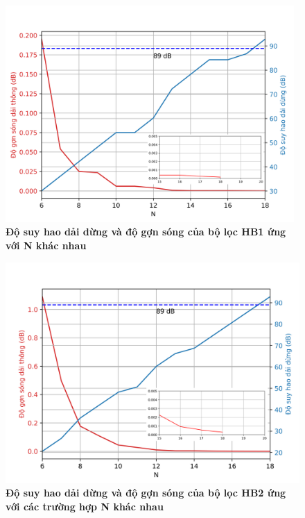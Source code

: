 \begin{figure}[H]
    \centering
    \includegraphics[width=11cm]{Images/Chuong4/plot/hb1.png}
    \caption[Độ suy hao dải dừng và độ gợn sóng của bộ lọc HB1 ứng với N khác nhau]{\bfseries \fontsize{12pt}{0pt}\selectfont Độ suy hao dải dừng và độ gợn sóng của bộ lọc HB1 ứng với N khác nhau}
    \label{hb111}
\end{figure}

\begin{figure}[H]
    \centering
    \includegraphics[width=11.5cm]{Images/Chuong4/plot/hb2.png}
    \caption[Độ suy hao dải dừng và độ gợn sóng của bộ lọc HB2 ứng với N khác nhau]{\bfseries \fontsize{12pt}{0pt}\selectfont Độ suy hao dải dừng và độ gợn sóng của bộ lọc HB2 ứng với các trường hợp N khác nhau}
    \label{hb222}
\end{figure}

